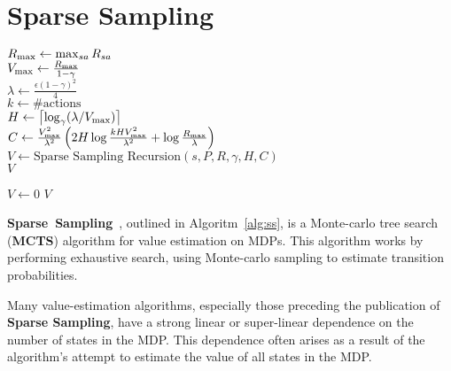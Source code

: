 \section{Sparse Sampling}

\begin{algorithm}[tb]
	\caption{$\mbox{Sparse~Sampling}(s, P, R, \gamma, \epsilon, \delta)$}
	\label{alg:ss}
	$R_{\rm max} \leftarrow \max_{sa}R_{sa}$\\
	$V_{\rm max} \leftarrow \frac{R_{\rm max}}{1-\gamma}$\\
	$\lambda \leftarrow \frac{\epsilon(1-\gamma)^2} 4$\\
	$k \leftarrow \#\mbox{actions}$\\
	$H \leftarrow \left\lceil\log_\gamma(\lambda/V_{\rm max})\right\rceil$\\
	$C \leftarrow \frac {V_{\rm max}^2}{\lambda^2}\left(2H\log\frac{kHV_{\rm max}^2}{\lambda^2}+\log\frac{R_{\rm max}}{\lambda}\right)$\\
	$V \leftarrow \mbox{Sparse~Sampling~Recursion}(s, P, R, \gamma, H, C)$\\
	\Return $V$
\end{algorithm}

\begin{algorithm}[tb]
	\caption{$\mbox{Sparse~Sampling~Recursion}(s, P, R, \gamma, d, C)$}
	\label{alg:ssr}
	 {
		$V \leftarrow 0$
	}
	\Return $V$
\end{algorithm}

{\bf Sparse~Sampling}~\cite{kearns99}, outlined in Algoritm~\ref{alg:ss}, is a Monte-carlo tree search ({\bf MCTS}) algorithm for value estimation on MDPs. This algorithm works by performing exhaustive search, using Monte-carlo sampling to estimate transition probabilities.

Many value-estimation algorithms, especially those preceding the publication of {\bf Sparse Sampling}, have a strong linear or super-linear dependence on the number of states in the MDP. This dependence often arises as a result of the algorithm's attempt to estimate the value of all states in the MDP.

